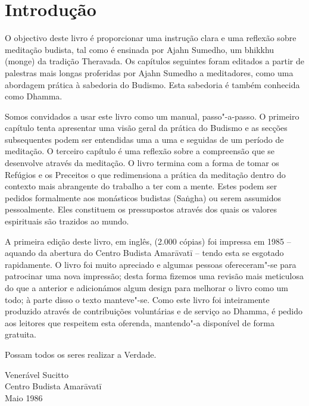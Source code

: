\chapter{Introdução}

O objectivo deste livro é proporcionar uma instrução clara e uma
reflexão sobre meditação budista, tal como é ensinada por Ajahn Sumedho,
um bhikkhu (monge) da tradição Theravada. Os capítulos seguintes foram
editados a partir de palestras mais longas proferidas por Ajahn Sumedho
a meditadores, como uma abordagem prática à sabedoria do Budismo. Esta
sabedoria é também conhecida como Dhamma.

Somos convidados a usar este livro como um manual, passo"-a-passo.
O primeiro capítulo tenta apresentar uma visão geral da
prática do Budismo e as secções subsequentes podem ser entendidas uma a
uma e seguidas de um período de meditação. O terceiro capítulo é uma
reflexão sobre a compreensão que se desenvolve através da meditação. O
livro termina com a forma de tomar os Refúgios e os Preceitos o que
redimensiona a prática da meditação dentro do contexto mais abrangente
do trabalho a ter com a mente. Estes podem ser pedidos formalmente aos
monásticos budistas (Saṅgha) ou serem assumidos pessoalmente. Eles
constituem os pressupostos através dos quais os valores espirituais são
trazidos ao mundo.

A primeira edição deste livro, em inglês, (2.000 cópias) foi impressa em
1985 -- aquando da abertura do Centro Budista Amarāvatī -- tendo esta se
esgotado rapidamente. O livro foi muito apreciado e algumas pessoas
ofereceram"-se para patrocinar uma nova impressão; desta forma fizemos
uma revisão mais meticulosa do que a anterior e adicionámos algum
design para melhorar o livro como um todo; à parte disso o texto
manteve"-se. Como este livro foi inteiramente produzido através de
contribuições voluntárias e de serviço ao Dhamma, é pedido aos leitores
que respeitem esta oferenda, mantendo"-a disponível de forma gratuita.

Possam todos os seres realizar a Verdade.

\bigskip

{\raggedleft
Venerável Sucitto\\
Centro Budista Amarāvatī\\
Maio 1986
\par}


